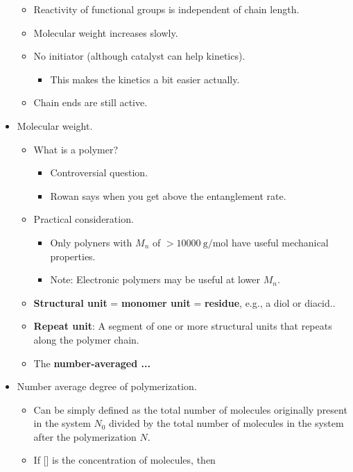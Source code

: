 \documentclass[../notes.tex]{subfiles}
\begin{document}
\begin{itemize}
\begin{itemize}
\begin{itemize}
        \end{itemize}
        \item Reactivity of functional groups is independent of chain length.
        \item Molecular weight increases slowly.
        \item No initiator (although catalyst can help kinetics).
        \begin{itemize}
            \item This makes the kinetics a bit easier actually.
        \end{itemize}
        \item Chain ends are still active.
    \end{itemize}
    \item Molecular weight.
    \begin{itemize}
        \item What is a polymer?
        \begin{itemize}
            \item Controversial question.
            \item Rowan says when you get above the entanglement rate.
        \end{itemize}
        \item Practical consideration.
        \begin{itemize}
            \item Only polyners with $M_n$ of $>\SI{10000}{\gram\per\mole}$ have useful mechanical properties.
            \item Note: Electronic polymers may be useful at lower $M_n$.
        \end{itemize}
        \item \textbf{Structural unit} = \textbf{monomer unit} = \textbf{residue}, e.g., a diol or diacid..
        \item \textbf{Repeat unit}: A segment of one or more structural units that repeats along the polymer chain.
        \item The \textbf{number-averaged ...}
    \end{itemize}
    \item Number average degree of polymerization.
    \begin{itemize}
        \item Can be simply defined as the total number of molecules originally present in the system $N_0$ divided by the total number of molecules in the system after the polymerization $N$.
        \item If [] is the concentration of molecules, then

\end{itemize}
\end{itemize}
\end{document}

